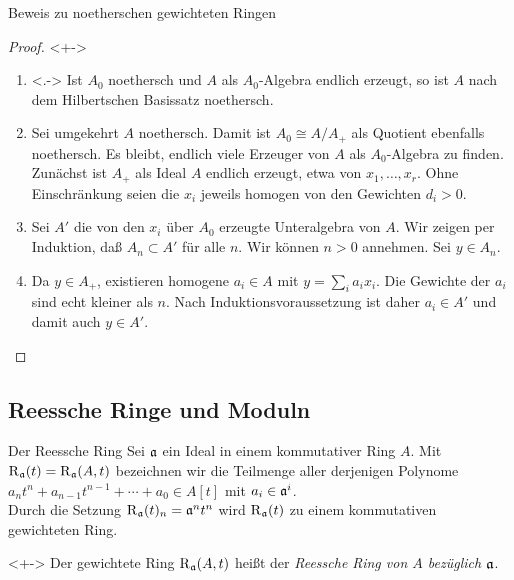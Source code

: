 \begin{frame}{Beweis zu noetherschen gewichteten Ringen}
	\begin{proof}<+->
		\begin{enumerate}[<+->]
		\item<.->
			Ist \(A_0\) noethersch und \(A\) als \(A_0\)-Algebra endlich erzeugt,
			so ist \(A\) nach dem Hilbertschen Basissatz noethersch.
		\item
			Sei umgekehrt \(A\) noethersch. Damit ist \(A_0 \cong A/A_+\) als
			Quotient ebenfalls noethersch. Es bleibt, endlich viele Erzeuger
			von \(A\) als \(A_0\)-Algebra zu finden. Zunächst ist
			\(A_+\) als Ideal \(A\) endlich erzeugt, etwa von \(x_1, \dotsc,
			x_r\). Ohne Einschränkung seien die \(x_i\) jeweils homogen von
			den Gewichten \(d_i > 0\).
		\item
			Sei \(A'\) die von den \(x_i\) über \(A_0\) erzeugte Unteralgebra
			von \(A\). Wir zeigen per Induktion, daß \(A_n \subset A'\) für
			alle \(n\). Wir können \(n > 0\) annehmen. Sei \(y \in A_n\).
		\item
			Da \(y \in A_+\), existieren homogene \(a_i \in A\) 
			mit \(y = \sum\limits_i a_i x_i\). Die Gewichte der \(a_i\) sind echt
			kleiner als \(n\). Nach Induktionsvoraussetzung ist daher \(a_i \in A'\)
			und damit auch \(y \in A'\).
			\qedhere
		\end{enumerate}
	\end{proof}
\end{frame}

\subsection{Reessche Ringe und Moduln}

\begin{frame}{Der Reessche Ring}
	Sei \(\mathfrak{a}\) ein Ideal in einem kommutativer Ring \(A\). Mit
	\(\operatorname{R}_{\mathfrak{a}}(t) = \operatorname{R}_{\mathfrak{a}}(A, t)\) bezeichnen wir die Teilmenge aller derjenigen Polynome
	\(a_n t^n + a_{n - 1} t^{n - 1} + \dotsb + a_0 \in A[t]\) mit
	\(a_i \in \mathfrak{a}^i\).
	\\
	Durch die Setzung \(\operatorname{R}_{\mathfrak{a}}(t)_n = \mathfrak{a}^n t^n\) wird
	\(\operatorname{R}_{\mathfrak{a}}(t)\) zu einem kommutativen gewichteten Ring.
	\begin{definition}<+->
		Der gewichtete Ring \(\operatorname{R}_{\mathfrak{a}}(A, t)\) heißt der \emph{Reessche
		Ring von \(A\) bezüglich \(\mathfrak{a}\)}.
	\end{definition}
\end{frame}

